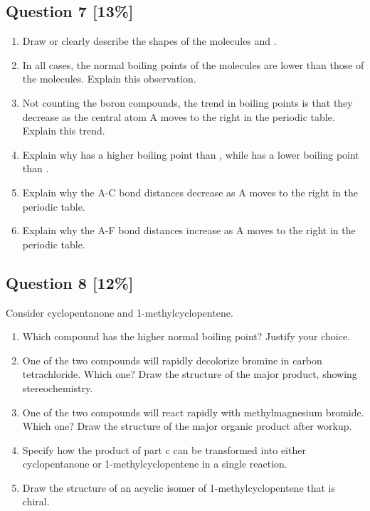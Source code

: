 \documentclass{article}
\begin{document}
\subsection*{Question 7 [13\%]}
\begin{enumerate}[label=\alph*.]
    \item Draw or clearly describe the shapes of the molecules  and .
    \vspace{2.5cm}
    \item In all cases, the normal boiling points of the  molecules are lower than those of the  molecules. Explain this observation.
    \vspace{2.5cm}
    \item Not counting the boron compounds, the trend in boiling points is that they decrease as the central atom A moves to the right in the periodic table. Explain this trend.
    \vspace{2.5cm}
    \item Explain why  has a higher boiling point than , while  has a lower boiling point than .
    \vspace{2.5cm}
    \item Explain why the A-C bond distances decrease as A moves to the right in the periodic table.
    \vspace{2.5cm}
    \item Explain why the A-F bond distances increase as A moves to the right in the periodic table.
    \vspace{2.5cm}
\end{enumerate}

\newpage

\subsection*{Question 8 [12\%]}
Consider cyclopentanone and 1-methylcyclopentene.
\begin{enumerate}[label=\alph*.]
    \item Which compound has the higher normal boiling point? Justify your choice.
    \vspace{3cm}
    \item One of the two compounds will rapidly decolorize bromine in carbon tetrachloride. Which one? Draw the structure of the major product, showing stereochemistry.
    \vspace{3cm}
    \item One of the two compounds will react rapidly with methylmagnesium bromide. Which one? Draw the structure of the major organic product after workup.
    \vspace{3.3cm}
    \item Specify how the product of part c can be transformed into either cyclopentanone or 1-methylcyclopentene in a single reaction.
    \vspace{3cm}
    \item Draw the structure of an acyclic isomer of 1-methylcyclopentene that is chiral.
    \vspace{3cm}
\end{enumerate}
\end{document}
